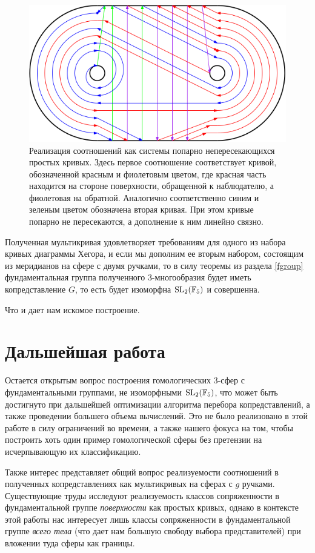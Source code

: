 \documentclass[a4paper, 12pt]{article}
\begin{document}
    \vspace{1cm}

    \begin{figure}[h] 
        \includegraphics[width=\textwidth]{diagram}
        \caption{Реализация соотношений как системы попарно непересекающихся простых кривых. Здесь первое соотношение соответствует кривой, обозначенной красным и фиолетовым цветом, где красная часть находится на стороне поверхности, обращенной к наблюдателю, а фиолетовая на обратной. Аналогично соответственно синим и зеленым цветом обозначена вторая кривая. При этом кривые попарно не пересекаются, а дополнение к ним линейно связно.}
    \end{figure}

    Полученная мультикривая удовлетворяет требованиям для одного из набора кривых диаграммы Хегора, и если мы дополним ее вторым набором, состоящим из меридианов на сфере с двумя ручками, то в силу теоремы из раздела \ref{fgroup} фундаментальная группа полученного 3-многообразия будет иметь копредставление $G$, то есть будет изоморфна $\textnormal{SL}_2(\mathbb{F}_5)$ и совершенна.

    Что и дает нам искомое построение.

\section{Дальшейшая работа}
    Остается открытым вопрос построения гомологических 3-сфер с фундаментальными группами, не изоморфными $\textnormal{SL}_2(\mathbb{F}_5)$, что может быть достигнуто при дальшейшей оптимизации алгоритма перебора копредставлений, а также проведении большего объема вычислений. Это не было реализовано в этой работе в силу ограничений во времени, а также нашего фокуса на том, чтобы построить хоть один пример гомологической сферы без претензии на исчерпывающую их классификацию.

    Также интерес представляет общий вопрос реализуемости соотношений в полученных копредставлениях как мультикривых на сферах с $g$ ручками. Существующие труды исследуют реализуемость классов сопряженности в фундаментальной группе \emph{поверхности} как простых кривых, однако в контексте этой работы нас интересует лишь классы сопряженности в фундаментальной группе \emph{всего тела} (что дает нам большую свободу выбора представителей) при вложении туда сферы как границы.
    
\printbibliography

\end{document}
